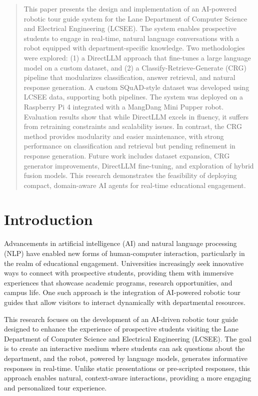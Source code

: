 \documentclass[conference]{IEEEtran}
\begin{document}
\begin{abstract}
    This paper presents the design and implementation of an AI-powered robotic tour guide system for the Lane Department of Computer Science and Electrical Engineering (LCSEE). 
    The system enables prospective students to engage in real-time, natural language conversations with a robot equipped with department-specific knowledge. 
    Two methodologies were explored: (1) a DirectLLM approach that fine-tunes a large language model on a custom dataset, and (2) a Classify-Retrieve-Generate (CRG) pipeline that modularizes classification, answer retrieval, and natural response generation. 
    A custom SQuAD-style dataset was developed using LCSEE data, supporting both pipelines. 
    The system was deployed on a Raspberry Pi 4 integrated with a MangDang Mini Pupper robot. 
    Evaluation results show that while DirectLLM excels in fluency, it suffers from retraining constraints and scalability issues. 
    In contrast, the CRG method provides modularity and easier maintenance, with strong performance on classification and retrieval but pending refinement in response generation. 
    Future work includes dataset expansion, CRG generator improvements, DirectLLM fine-tuning, and exploration of hybrid fusion models. 
    This research demonstrates the feasibility of deploying compact, domain-aware AI agents for real-time educational engagement.
\end{abstract}


\section{Introduction}
Advancements in artificial intelligence (AI) and natural language processing (NLP) have enabled new forms of human-computer interaction, particularly in the realm of educational engagement. 
Universities increasingly seek innovative ways to connect with prospective students, providing them with immersive experiences that showcase academic programs, research opportunities, and campus life. 
One such approach is the integration of AI-powered robotic tour guides that allow visitors to interact dynamically with departmental resources.

This research focuses on the development of an AI-driven robotic tour guide designed to enhance the experience of prospective students visiting the Lane Department of Computer Science and Electrical Engineering (LCSEE). 
The goal is to create an interactive medium where students can ask questions about the department, and the robot, powered by language models, generates informative responses in real-time. 
Unlike static presentations or pre-scripted responses, this approach enables natural, context-aware interactions, providing a more engaging and personalized tour experience.
\end{document}
